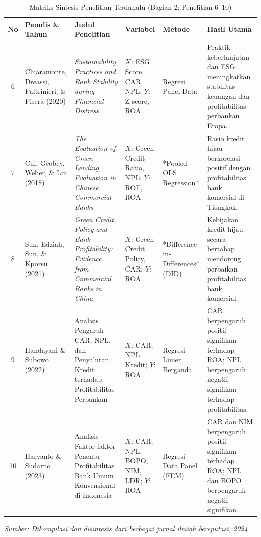 \documentclass[12pt,a4paper]{article}
\numberwithin{equation}{section}
\begin{document}
\begin{table}[H]
  \caption{Matriks Sintesis Penelitian Terdahulu (Bagian 2: Penelitian 6--10)}
  \label{tab:penelitian_terdahulu_b}
  \footnotesize
  \begin{tabularx}{\textwidth}{|c|>{\raggedright\arraybackslash}p{2.3cm}|>{\raggedright\arraybackslash}X|>{\raggedright\arraybackslash}p{1.9cm}|>{\raggedright\arraybackslash}p{1.8cm}|>{\raggedright\arraybackslash}X|}
    \hline
    \textbf{No} & \textbf{Penulis \& Tahun} & \textbf{Judul Penelitian} & \textbf{Variabel} & \textbf{Metode} & \textbf{Hasil Utama} \\
    \hline
    6 & Chiaramonte, Dreassi, Paltrinieri, \& Piser\`a (2020) & \emph{Sustainability Practices and Bank Stability during Financial Distress} & $X$: ESG Score, CAR, NPL; $Y$: Z-score, ROA & Regresi Panel Data & Praktik keberlanjutan dan ESG meningkatkan stabilitas keuangan dan profitabilitas perbankan Eropa. \\
    \hline
    7 & Cui, Geobey, Weber, \& Lin (2018) & \emph{The Evaluation of Green Lending Evaluation in Chinese Commercial Banks} & $X$: Green Credit Ratio, NPL; $Y$: ROE, ROA & *Pooled OLS Regression* & Rasio kredit hijau berkorelasi positif dengan profitabilitas bank komersial di Tiongkok. \\
    \hline
    8 & Sun, Edziah, Sun, \& Kporsu (2021) & \emph{Green Credit Policy and Bank Profitability: Evidence from Commercial Banks in China} & $X$: Green Credit Policy, CAR; $Y$: ROA & *Difference-in-Differences* (DID) & Kebijakan kredit hijau secara bertahap mendorong perbaikan profitabilitas bank komersial. \\
    \hline
    9 & Handayani \& Subowo (2022) & Analisis Pengaruh CAR, NPL, dan Penyaluran Kredit terhadap Profitabilitas Perbankan & $X$: CAR, NPL, Kredit; $Y$: ROA & Regresi Linier Berganda & CAR berpengaruh positif signifikan terhadap ROA; NPL berpengaruh negatif signifikan terhadap profitabilitas. \\
    \hline
    10 & Haryanto \& Sudarno (2023) & Analisis Faktor-faktor Penentu Profitabilitas Bank Umum Konvensional di Indonesia & $X$: CAR, NPL, BOPO, NIM, LDR; $Y$: ROA & Regresi Data Panel (FEM) & CAR dan NIM berpengaruh positif signifikan terhadap ROA; NPL dan BOPO berpengaruh negatif signifikan. \\
    \hline
  \end{tabularx}
  \begin{flushleft}
    \textit{Sumber: Dikompilasi dan disintesis dari berbagai jurnal ilmiah bereputasi, 2024}
  \end{flushleft}
\end{table}
\end{document}
